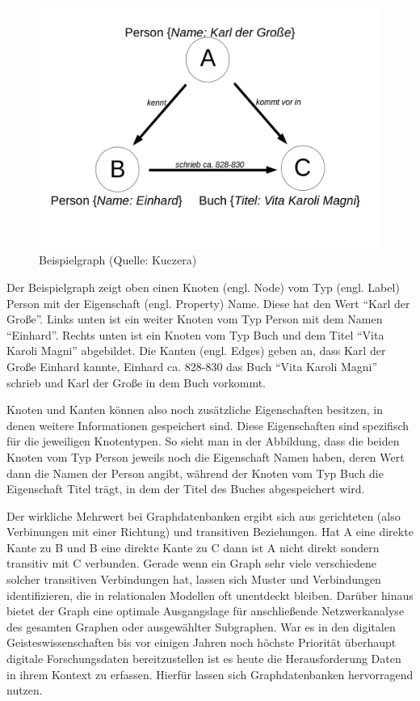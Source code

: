 \documentclass[ngerman,]{scrreprt}
\begin{document}
\begin{figure}
\centering
\includegraphics{Bilder/Beispielgraph.png}
\caption{Beispielgraph (Quelle: Kuczera)}
\label{fig:2-1}
\end{figure}

Der Beispielgraph zeigt oben einen Knoten (engl. Node) vom Typ (engl. Label) Person mit der Eigenschaft (engl. Property) Name. Diese hat den Wert ``Karl der Große''. Links unten ist ein weiter Knoten vom Typ Person mit dem Namen ``Einhard''. Rechts unten ist ein Knoten vom Typ Buch und dem Titel ``Vita Karoli Magni'' abgebildet. Die Kanten (engl. Edges) geben an, dass Karl der Große Einhard kannte, Einhard ca. 828-830 das Buch ``Vita Karoli Magni'' schrieb und Karl der Große in dem Buch vorkommt.

Knoten und Kanten können also noch zusätzliche Eigenschaften besitzen, in denen weitere Informationen gespeichert sind. Diese Eigenschaften sind spezifisch für die jeweiligen Knotentypen. So sieht man in der Abbildung, dass die beiden Knoten vom Typ Person jeweils noch die Eigenschaft Namen haben, deren Wert dann die Namen der Person angibt, während der Knoten vom Typ Buch die Eigenschaft Titel trägt, in dem der Titel des Buches abgespeichert wird.

Der wirkliche Mehrwert bei Graphdatenbanken ergibt sich aus gerichteten (also Verbinungen mit einer Richtung) und transitiven Beziehungen. Hat A eine direkte Kante zu B und B eine direkte Kante zu C dann ist A nicht direkt sondern transitiv mit C verbunden. Gerade wenn ein Graph sehr viele verschiedene solcher transitiven Verbindungen hat, lassen sich Muster und Verbindungen identifizieren, die in relationalen Modellen oft unentdeckt bleiben. Darüber hinaus bietet der Graph eine optimale Ausgangslage für anschließende Netzwerkanalyse des gesamten Graphen oder ausgewählter Subgraphen. War es in den digitalen Geisteswissenschaften bis vor einigen Jahren noch höchste Priorität überhaupt digitale Forschungsdaten bereitzustellen ist es heute die Herausforderung Daten in ihrem Kontext zu erfassen. Hierfür lassen sich Graphdatenbanken hervorragend nutzen.
\end{document}
